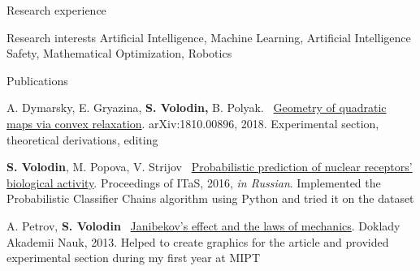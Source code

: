 \documentclass{resume} %
\begin{document}
\begin{rSection}{Research experience}
\end{rSection}

\begin{rSection}{Research interests}
	Artificial Intelligence, Machine Learning, Artificial Intelligence Safety, Mathematical Optimization, Robotics
\end{rSection}

\begin{rSection}{Publications}
\vspace{-1em}
\item A. Dymarsky, E. Gryazina, {\bf S. Volodin,} B. Polyak. \faExternalLink~\href{https://arxiv.org/pdf/1810.00896.pdf}{Geometry of quadratic maps via convex relaxation}. arXiv:1810.00896, 2018. Experimental section, theoretical derivations, editing
\item {\bf S. Volodin}, M. Popova, V. Strijov \faExternalLink~\href{http://itas2016.iitp.ru/pdf/1570303389.pdf}{Probabilistic prediction of nuclear receptors’ biological activity}. Proceedings of ITaS, 2016, {\em in Russian}. Implemented the Probabilistic Classifier Chains algorithm using Python and tried it on the dataset
\item A. Petrov, {\bf S. Volodin} \faExternalLink~\href{https://link.springer.com/article/10.1134/S1028335813080041}{Janibekov's effect and the laws of mechanics}. Doklady Akademii Nauk, 2013. Helped to create graphics for the article and provided experimental section during my first year at MIPT
\end{rSection}
\end{document}
